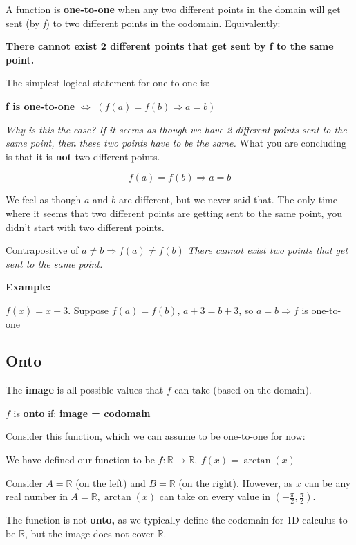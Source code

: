 \documentclass[12pt]{article}
\theoremstyle{plain}
\theoremstyle{remark}
\theoremstyle{definition}
\begin{document}
A function is \textbf{one-to-one} when any two different points in the
domain will get sent (by \emph{f}) to two different points in the
codomain. Equivalently:

\textbf{There cannot exist 2 different points that get sent by f to the
same point.}

The simplest logical statement for one-to-one is:

\textbf{f is one-to-one} \(\Leftrightarrow\)
\(\left( f(a) = f(b) \Rightarrow a = b \right)\)

\emph{Why is this the case? If it seems as though we have 2 different
points sent to the same point, then these two points have to be the
same.} What you are concluding is that it is \textbf{not} two different
points.

\[f(a) = f(b) \Rightarrow a = b\]

We feel as though \(a\) and \(b\) are different, but we never said that.
The only time where it seems that two different points are getting sent
to the same point, you didn't start with two different points.

Contrapositive of \(a \neq b \Rightarrow f(a) \neq f(b)\) \emph{There
cannot exist two points that get sent to the same point.}

\textbf{Example:}

\(f(x) = x + 3\). Suppose \(f(a) = f(b)\), \(a + 3 = b + 3\), so
\(a = b \Rightarrow f\) is one-to-one


\subsection{Onto}

The \textbf{image} is all possible values that \(f\) can take (based on
the domain).

\(f\) is \textbf{onto} if: \textbf{image = codomain}

Consider this function, which we can assume to be one-to-one for now:

We have defined our function to be
\(f\mathbb{:R \rightarrow R,\ }f(x) = \arctan(x)\)

Consider \(A\mathbb{= R}\) (on the left) and \(B\mathbb{= R}\) (on the
right). However, as \(x\) can be any real number in
\(A\mathbb{= R,}\arctan(x)\) can take on every value in
\(\left( - \frac{\pi}{2},\frac{\pi}{2} \right)\).

The function is not \textbf{onto,} as we typically define the codomain
for 1D calculus to be \(\mathbb{R}\), but the image does not cover
\(\mathbb{R}\).
\end{document}
